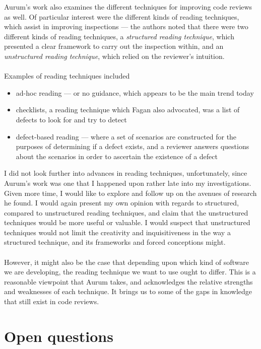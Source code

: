 Aurum's work also examines the different techniques for improving code reviews as
well.
Of particular interest were the different kinds of reading techniques, which assist in improving inspections --- the
authors noted that there were two different kinds of reading techniques, a {\em structured
reading technique}, which presented a clear framework to carry out the inspection within, and an
{\em unstructured reading technique}, which relied on the reviewer's intuition.\\
\\
Examples of reading techniques included
\begin{itemize}
	\item ad-hoc reading --- or no guidance, which appears to be the main trend today
	\item checklists, a reading technique which Fagan \cite{AdvancesInSoftwareInspection} also
		advocated, was a list of defects to look for and try to detect
	\item defect-based reading --- where a set of scenarios are constructed for the purposes of
		determining if a defect exists, and a reviewer answers questions about the scenarios in
		order to ascertain the existence of a defect
\end{itemize}

I did not look further into advances in reading techniques, unfortunately, since Aurum's work was
one that I happened upon rather late into my investigations.
Given more time, I would like to explore and follow up on the avenues of research he found.
I would again present my own opinion with regards to structured, compared to unstructured reading
techniques, and claim that the unstructured techniques would be more useful or valuable.
I would suspect that unstructured techniques would not limit the creativity and inquisitiveness in the
way a structured technique, and its frameworks and forced conceptions might.\\
\\
However, it might also be the case that depending upon which kind of software we are developing, the
reading technique we want to use ought to differ.
This is a reasonable viewpoint that Aurum takes, and acknowledges the relative strengths and
weaknesses of each technique.
It brings us to some of the gaps in knowledge that still exist in code reviews.

\section{Open questions}

